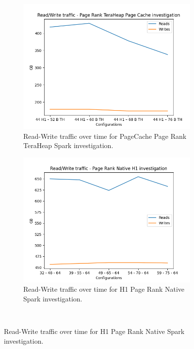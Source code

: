 \begin{figure}[htbp]
\begin{subfigure}[b]{0.48\textwidth}
    \includegraphics[width=\linewidth]{./fig/rw_pr_pc_th.png}
    \caption{Read-Write traffic over time for PageCache Page Rank
    TeraHeap Spark investigation.}
    \label{fig:rw_pr_pc_th}
\end{subfigure}

\begin{subfigure}[b]{0.48\textwidth}
    \includegraphics[width=\linewidth]{./fig/rw_pr_h1_native.png}
    \caption{Read-Write traffic over time for H1 Page Rank
    Native Spark investigation.}
    \label{fig:rw_pr_h1_native}
\end{subfigure}\\[1em]
\end{figure}

